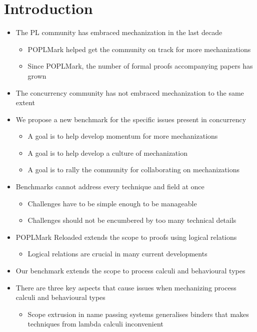 \documentclass{article}
\begin{document}
\section{Introduction}
\begin{itemize}
\item The PL community has embraced mechanization in the last decade
  \begin{itemize}
  \item POPLMark helped get the community on track for more mechanizations
  \item Since POPLMark, the number of formal proofs accompanying papers has grown
  \end{itemize}
\item The concurrency community has not embraced mechanization to the same extent
\item We propose a new benchmark for the specific issues present in concurrency
  \begin{itemize}
  \item A goal is to help develop momentum for more mechanizations
  \item A goal is to help develop a culture of mechanization
  \item A goal is to rally the community for collaborating on mechanizations
  \end{itemize}
\item Benchmarks cannot address every technique and field at once
  \begin{itemize}
  \item Challenges have to be simple enough to be manageable
  \item Challenges should not be encumbered by too many technical details
  \end{itemize}
\item POPLMark Reloaded extends the scope to proofs using logical relations
  \begin{itemize}
  \item Logical relations are crucial in many current developments
  \end{itemize}
\item Our benchmark extends the scope to process calculi and behavioural types
\item There are three key aspects that cause issues when mechanizing process calculi and behavioural types
  \begin{itemize}
  \item Scope extrusion in name passing systems generalises binders that makes techniques from lambda calculi inconvenient

\end{itemize}
\end{itemize}
\end{document}
